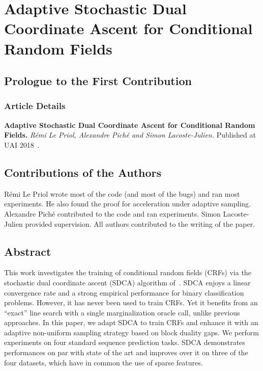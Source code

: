 \setcounter{theorem}{0}

\def\balpha{\boldsymbol{\alpha}}
\def\bmu{\boldsymbol{\mu}}
\def\bw{\boldsymbol{w}}
\newcommand{\bu}{\bm u}
\newcommand{\bv}{\bm v}
\newcommand{\strgconvex}{\mu}
\newcommand{\QM}{QM} %


\chapter{Adaptive Stochastic Dual Coordinate Ascent for Conditional Random Fields}
\label{ch:sdca}

\section{Prologue to the First Contribution}

\subsection{Article Details}

\textbf{Adaptive Stochastic Dual Coordinate Ascent for Conditional Random Fields.}
\emph{R\'emi Le Priol, Alexandre Pich\'e and Simon Lacoste-Julien.}
Published at UAI 2018~\citep{lepriol2018adaptive}.

\section{Contributions of the Authors}
Rémi Le Priol wrote most of the code (and most of the bugs) and ran most experiments.
He also found the proof for acceleration under adaptive sampling.
Alexandre Piché contributed to the code and ran experiments.
Simon Lacoste-Julien provided supervision.
All authors contributed to the writing of the paper.

 \section{Abstract}
This work investigates the training of conditional random fields (CRFs) via the stochastic dual coordinate ascent (SDCA) algorithm of~\citet{shalev2016accelerated}.
SDCA enjoys a linear convergence rate and a strong empirical performance for binary classification problems.
However, it has never been used to train CRFs.
Yet it benefits from an ``exact'' line search with a single marginalization oracle call, unlike previous approaches.
In this paper, we adapt SDCA to train CRFs and enhance it with an adaptive non-uniform sampling strategy based on block duality gaps.
We perform experiments on four standard sequence prediction tasks.
SDCA demonstrates performances on par with state of the art and improves over it on three of the four datasets, which have in common the use of sparse features.

